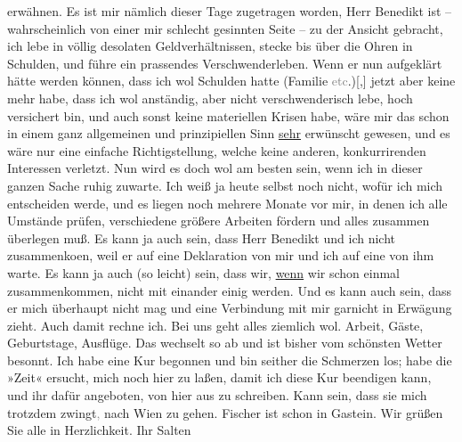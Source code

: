 \begin{ledgroupsized}[t]{13cm}
               erwähnen. Es ist mir nämlich dieser Tage zugetragen worden, Herr Benedikt ist – wahrscheinlich von einer mir schlecht
               gesinnten Seite – zu der Ansicht gebracht, ich lebe in völlig desolaten
               Geldverhältnissen, stecke bis über die Ohren in Schulden, und führe ein prassendes
               Verschwenderleben. Wenn er nun aufgeklärt hätte werden können, dass ich wol Schulden
               hatte (Familie \textcolor{gray}{etc}.){[},{]} jetzt aber keine mehr
               habe, dass ich wol anständig, aber nicht verschwenderisch lebe, hoch versichert bin,
               und auch sonst keine materiellen Krisen habe, wäre mir das schon in einem ganz
               allgemeinen und prinzipiellen Sinn \uline{sehr} erwünscht
               gewesen, und es wäre nur eine einfache Richtigstellung, welche keine anderen,
               konkurrirenden Interessen verletzt. Nun wird es doch wol am besten sein, wenn ich in
               dieser ganzen Sache ruhig zuwarte. Ich weiß ja heute selbst {\pb}noch nicht, wofür ich mich
               entscheiden werde, und es liegen noch mehrere Monate vor mir, in denen ich alle
               Umstände prüfen, verschiedene größere Arbeiten fördern und alles zusammen überlegen
               muß. Es kann ja auch sein, dass Herr Benedikt
               und ich nicht zusammenko{\geminationm}en, weil er auf eine
               Deklaration von mir und ich auf eine von ihm warte. Es kann ja auch (so leicht) sein,
               dass wir, \uline{wenn} wir schon einmal zusammenkommen, nicht
               mit einander einig werden. Und es kann auch sein, dass er mich überhaupt nicht mag
               und eine Verbindung mit mir garnicht in Erwägung zieht. Auch damit rechne ich.\pend
           \pstart
           Bei uns geht alles ziemlich
               wol. Arbeit, Gäste, Geburtstage, Ausflüge. Das wechselt so ab und ist bisher vom
               schönsten Wetter besonnt. Ich habe eine Kur begonnen und bin seither die Schmerzen
               los; habe die »Zeit« ersucht, mich noch hier zu laßen, damit ich diese
               Kur beendigen kann, und ihr dafür angeboten, von hier aus zu schreiben. Kann sein,
               dass sie mich trotzdem zwingt\textcolor{gray}{,} nach Wien zu gehen. Fischer ist schon in
                  Gastein. Wir grüßen Sie alle in
               Herzlichkeit.\pend
           \pstart Ihr \spacefill\mbox{Salten}\pend{}
         
         \endnumbering{}\end{ledgroupsized}  \newcommand{\dateiname}{L03553}\newcommand{\titel}{Felix Salten an Arthur Schnitzler, 16. 8. 1911}\newcommand{\editorInnen}{Martin Anton Müller und Laura Untner}
      